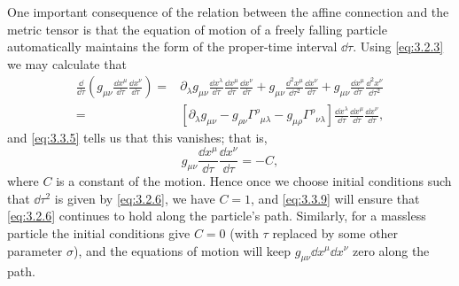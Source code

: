 One important consequence of the relation between the affine connection and
the metric tensor is that the equation of motion of a freely falling particle
automatically maintains the form of the proper-time interval $\dd\tau$.
Using \eqref{eq:3.2.3} we may calculate that
\begin{align*}
  \frac{\dd}{\dd\tau}\left(
  g_{\mu\nu}\frac{\dd x^\mu}{\dd\tau}
  \frac{\dd x^\nu}{\dd\tau}\right)
  ={}&
  \partial_\lambda g_{\mu\nu}
  \frac{\dd x^\lambda}{\dd\tau}
  \frac{\dd x^\mu}{\dd\tau}
  \frac{\dd x^\nu}{\dd\tau}
  +g_{\mu\nu}\frac{\dd^2x^\mu}{\dd\tau^2}
  \frac{\dd x^\nu}{\dd\tau}
  +g_{\mu\nu}\frac{\dd x^\mu}{\dd\tau}
  \frac{\dd^2x^\nu}{\dd\tau^2}
  \\
  ={}&
  \left[\partial_\lambda g_{\mu\nu}
  -g_{\rho\nu}\Gamma^\rho{}_{\mu\lambda}
  -g_{\mu\rho}\Gamma^\rho{}_{\nu\lambda}\right]
  \frac{\dd x^\lambda}{\dd\tau}
  \frac{\dd x^\mu}{\dd\tau}
  \frac{\dd x^\nu}{\dd\tau},
\end{align*}
and \eqref{eq:3.3.5} tells us that this vanishes; that is,
\begin{equation}
  g_{\mu\nu}\frac{\dd x^\mu}{\dd\tau}
  \frac{\dd x^\nu}{\dd\tau}=-C,
  \tag{3.3.9}\label{eq:3.3.9}
\end{equation}
where $C$ is a constant of the motion. Hence once we choose initial
conditions such that $\dd\tau^2$ is given by \eqref{eq:3.2.6}, we have
$C=1$, and \eqref{eq:3.3.9} will ensure that \eqref{eq:3.2.6} continues to
hold along the particle's path. Similarly, for a massless particle the
initial conditions give $C=0$ (with $\tau$ replaced by some other parameter
$\sigma$), and the equations of motion will keep
$g_{\mu\nu}\dd x^\mu\dd x^\nu$ zero along the path.

